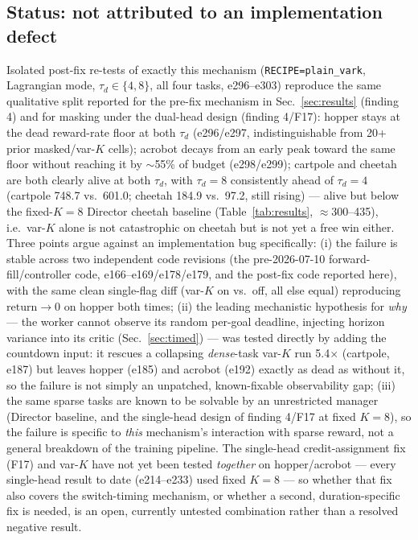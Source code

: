 \documentclass[10pt]{article}
\begin{document}
\subsection{Status: not attributed to an implementation defect}
Isolated post-fix re-tests of exactly this mechanism (\texttt{RECIPE=plain\_vark},
Lagrangian mode, $\tau_d\in\{4,8\}$, all four tasks, e296--e303) reproduce the
same qualitative split reported for the pre-fix mechanism in
Sec.~\ref{sec:results} (finding 4) and for masking under the dual-head design
(finding 4/F17): hopper stays at the dead reward-rate floor at both $\tau_d$
(e296/e297, indistinguishable from 20+ prior masked/var-$K$ cells); acrobot
decays from an early peak toward the same floor without reaching it by
$\sim$55\% of budget (e298/e299); cartpole and cheetah are both clearly alive
at both $\tau_d$, with $\tau_d{=}8$ consistently ahead of $\tau_d{=}4$
(cartpole 748.7 vs.\ 601.0; cheetah 184.9 vs.\ 97.2, still rising) --- alive
but below the fixed-$K{=}8$ Director cheetah baseline (Table~\ref{tab:results},
$\approx$300--435), i.e.\ var-$K$ alone is not catastrophic on cheetah but is
not yet a free win either. Three points argue against an implementation bug
specifically:
(i) the failure is stable across two independent code revisions (the
pre-2026-07-10 forward-fill/controller code, e166--e169/e178/e179, and the
post-fix code reported here), with the same clean single-flag diff (var-$K$
on vs.\ off, all else equal) reproducing $\mathrm{return}\to 0$ on hopper both
times;
(ii) the leading mechanistic hypothesis for \emph{why} --- the worker cannot
observe its random per-goal deadline, injecting horizon variance into its
critic (Sec.~\ref{sec:timed}) --- was tested directly by adding the countdown
input: it rescues a collapsing \emph{dense}-task var-$K$ run 5.4$\times$
(cartpole, e187) but leaves hopper (e185) and acrobot (e192) exactly as dead
as without it, so the failure is not simply an unpatched, known-fixable
observability gap;
(iii) the same sparse tasks are known to be solvable by an unrestricted
manager (Director baseline, and the single-head design of finding 4/F17 at
fixed $K{=}8$), so the failure is specific to \emph{this} mechanism's
interaction with sparse reward, not a general breakdown of the training
pipeline. The single-head credit-assignment fix (F17) and var-$K$ have not
yet been tested \emph{together} on hopper/acrobot --- every single-head
result to date (e214--e233) used fixed $K{=}8$ --- so whether that fix also
covers the switch-timing mechanism, or whether a second, duration-specific
fix is needed, is an open, currently untested combination rather than a
resolved negative result.
\end{document}
